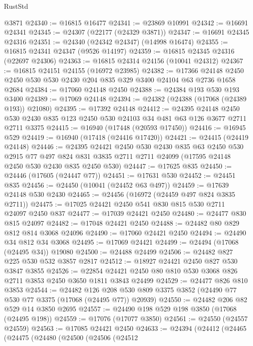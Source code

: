 \begin{lexlean}{RustStd}
\begin{coremodule}
    @3871
@24340 := @16815 @16477
@24341 := @23869 @10991
@24342 := @16691 @24341
@24345 := @24307 (@22177 (@24329 @3871))
@24347 := @16691 @24345 @24316
@24351 := @24340 (@24342 @24347) (@14998 @16474)
@24355 := @16815 @24341 @24347 (@9526 @14197)
@24359 := @16815 @24345 @24316 (@22697 @24306)
@24363 := @16815 @24314 @24156 (@10041 @24312)
@24367 := @16815 @24151 @24155 (@16972 @23985)
@24382 := @17366
    @24148
    @2450
    @2450
    @530
    @530
    @2430
    @204
    @835
    @329
    @3400
    @24104
    @63
    @2736
    @1658
    @2684
@24384 := @17060 @24148 @2450
@24388 := @24384 @193 @530 @193 @3400
@24389 := @17069 @24148
@24394 := @24382 (@24388 (@17068 (@24389 @193)) @21080)
@24395 := @17392 @24148
@24412 := @24395
    @24148
    @2450
    @530
    @2430
    @835
    @123
    @2450
    @530
    @24103
    @34
    @481
    @63
    @126
    @3677
    @2711
    @2711
    @3375
@24415 := @16940 (@17448 (@20593 @17450))
@24416 := @16945 @529
@24419 := @16940 (@17418 (@24416 @17420))
@24421 := @24415 (@24419 @24148)
@24446 := @24395
    @24421
    @2450
    @530
    @2430
    @835
    @63
    @2450
    @530
    @2915
    @77
    @497
    @824
    @831
    @3835
    @2711
    @2711
    @24099
    (@17595 @24148 @2450 @530 @2430 @835 @2450 @530)
@24447 := @17625 @835
@24450 := @24446 (@17605 (@24447 @77))
@24451 := @17631 @530
@24452 := @24451 @835
@24456 := @24450 (@10041 (@24452 @63 @497))
@24459 := @17639 @24148 @530 @2430
@24465 := @24456 (@16972 (@24459 @497 @824 @3835 @2711))
@24475 := @17025 @24421 @2450 @541 @830 @815 @530 @2711 @24097 @2450 @837
@24477 := @17039 @24421 @2450
@24480 := @24477 @830 @815 @24097
@24482 := @17048 @24421 @2450
@24488 := @24482 @80 @829 @812 @814 @3068 @24096
@24490 := @17060 @24421 @2450
@24494 := @24490 @34 @812 @34 @3068
@24495 := @17069 @24421
@24499 := @24494 (@17068 (@24495 @34)) @19080
@24500 := @24488 @24499
@24506 := @24482 @827 @225 @530 @532 @3857 @2817
@24512 := @18927 @24421 @2450 @827 @530 @3847 @3855
@24526 := @22854 @24421 @2450 @80 @810 @530 @3068 @826 @2711 @3853 @2450 @3650 @1811 @3843 @24499
@24529 := @24477 @826 @810 @3853
@24544 := @24482
    @126
    @208
    @530
    @809
    @3375
    @3852
    (@24490 @77 @530 @77 @3375 (@17068 (@24495 @77)) @20939)
@24550 := @24482 @206 @82 @529 @14 @3850 @2695
@24557 := @24490 @198 @529 @198 @3850 (@17068 (@24495 @198))
@24559 := @17076 (@17077 @3850)
@24561 := @24550 (@24557 @24559)
@24563 := @17085 @24421 @2450
@24633 := @24394
    (@24412
      (@24465
        (@24475
          (@24480
            (@24500
              (@24506
                (@24512

\end{coremodule}
\end{lexlean}
